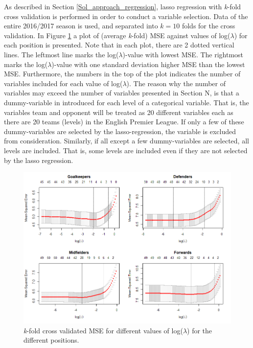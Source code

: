 As described in Section \ref{Sol_approach_regression}, lasso regression with \textit{k}-fold cross validation is performed in order to conduct a variable selection. Data of the entire 2016/2017 season is used, and separated into $\textit{k}=10$ folds for the cross validation. In Figure \ref{fig:lasso_all} a plot of (average \textit{k}-fold) MSE against values of log($\lambda$) for each position is presented. Note that in each plot, there are 2 dotted vertical lines. The leftmost line marks the log($\lambda$)-value with lowest MSE. The rightmost marks the log($\lambda$)-value with one standard deviation higher MSE than the lowest MSE. Furthermore, the numbers in the top of the plot indicates the number of variables included for each value of log($\lambda$). The reason why the number of variables may exceed the number of variables presented in Section N, is that a dummy-variable in introduced for each level of a categorical variable. That is, the variables team and opponent will be treated as 20 different variables each as there are 20 teams (levels) in the English Premier League. If only a few of these dummy-variables are selected by the lasso-regression, the variable is excluded from consideration. Similarly, if all except a few dummy-variables are selected, all levels are included. That is, some levels are included even if they are not selected by the lasso regression.

\newpar

\begin{figure}[H]
    \centering
    \includegraphics[scale=0.55]{fig/chapter_6/lasso_all.png}
    \caption{\textit{k}-fold cross validated MSE for different values of log($\lambda$) for the different positions.}
\label{fig:lasso_all}    
\end{figure}

